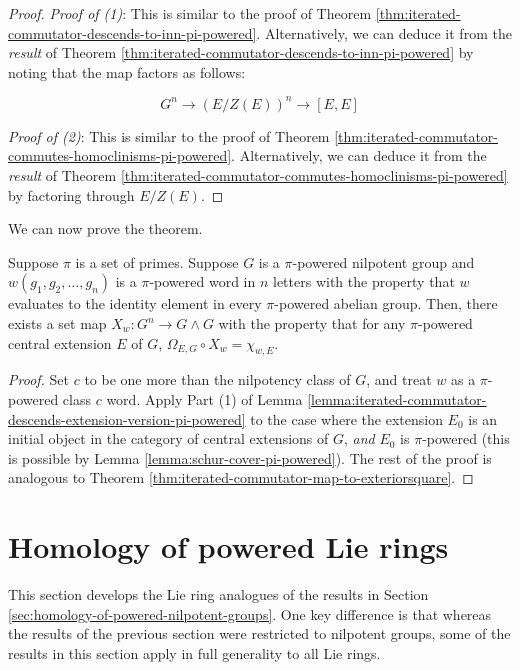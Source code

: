 \documentclass{ucetd}
\begin{document}
\begin{proof}
  {\em Proof of (1)}: This is similar to the proof of Theorem
  \ref{thm:iterated-commutator-descends-to-inn-pi-powered}. Alternatively, we can
  deduce it from the {\em result} of Theorem
  \ref{thm:iterated-commutator-descends-to-inn-pi-powered} by noting that the
  map factors as follows:

  $$G^n \to (E/Z(E))^n \to [E,E]$$

  {\em Proof of (2)}: This is similar to the proof of Theorem
  \ref{thm:iterated-commutator-commutes-homoclinisms-pi-powered}. Alternatively,
  we can deduce it from the {\em result} of Theorem
  \ref{thm:iterated-commutator-commutes-homoclinisms-pi-powered} by factoring
  through $E/Z(E)$.
\end{proof}

We can now prove the theorem.

\begin{theorem}\label{thm:iterated-commutator-map-to-exteriorsquare-pi-powered}
  Suppose $\pi$ is a set of primes. Suppose $G$ is a $\pi$-powered
  nilpotent group and $w(g_1,g_2,\dots,g_n)$ is a $\pi$-powered word
  in $n$ letters with the property that $w$ evaluates to the identity
  element in every $\pi$-powered abelian group. Then, there exists a
  set map $X_w:G^n \to G \wedge G$ with the property that for any
  $\pi$-powered central extension $E$ of $G$, $\Omega_{E,G} \circ X_w
  = \chi_{w,E}$.
\end{theorem}

\begin{proof}
  Set $c$ to be one more than the nilpotency class of $G$, and treat
  $w$ as a $\pi$-powered class $c$ word. Apply Part (1) of Lemma
  \ref{lemma:iterated-commutator-descends-extension-version-pi-powered}
  to the case where the extension $E_0$ is an initial object in the
  category of central extensions of $G$, {\em and} $E_0$ is
  $\pi$-powered (this is possible by Lemma
  \ref{lemma:schur-cover-pi-powered}). The rest of the proof is
  analogous to Theorem
  \ref{thm:iterated-commutator-map-to-exteriorsquare}.
\end{proof}

\section{Homology of powered Lie rings}\label{sec:homology-of-powered-nilpotent-lie-rings}

This section develops the Lie ring analogues of the results in Section
\ref{sec:homology-of-powered-nilpotent-groups}. One key difference is
that whereas the results of the previous section were restricted to
nilpotent groups, some of the results in this section apply in full
generality to all Lie rings.
\end{document}
